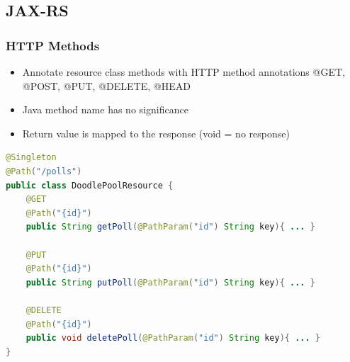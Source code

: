 \documentclass[10pt]{article}
\begin{document}
\subsection{JAX-RS}
\subsubsection{HTTP Methods}
\begin{itemize}
	\item Annotate resource class methods with HTTP method annotations @GET, @POST, @PUT, @DELETE, @HEAD
	\item Java method name has no significance
	\item Return value is mapped to the response (void = no response)
\end{itemize}

\begin{lstlisting}[language=Java, caption=JAX-RS Service = Annotated Java Class, style=JavaStyle]
@Singleton
@Path("/polls")
public class DoodlePoolResource {
	@GET
	@Path("{id}")
	public String getPoll(@PathParam("id") String key){ ... }
	
	@PUT
	@Path("{id}")
	public String putPoll(@PathParam("id") String key){ ... }
	
	@DELETE
	@Path("{id}")
	public void deletePoll(@PathParam("id") String key){ ... }
}
\end{lstlisting}
\end{document}
